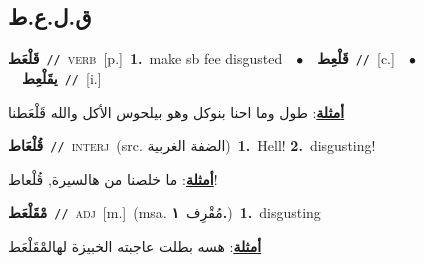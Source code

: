 \documentclass[10pt,a4paper,twoside]{article} %
\begin{document}
\begin{multicols}{2}
\vspace{-3mm}
\subsection*{\color{blue}\foreignlanguage{arabic}{ق.ل.ع.ط}\color{blue}{}} 

{\setlength\topsep{0pt}\textbf{\foreignlanguage{arabic}{قَلْعَط}}\ {\color{gray}\texttt{//}\color{black}}\ \textsc{verb}\ [p.]\ \textbf{1.}~make sb fee disgusted\ \ $\bullet$\ \ \setlength\topsep{0pt}\textbf{\foreignlanguage{arabic}{قَلْعِط}}\ {\color{gray}\texttt{//}\color{black}}\ [c.]\ \ $\bullet$\ \ \setlength\topsep{0pt}\textbf{\foreignlanguage{arabic}{يقَلْعِط}}\ {\color{gray}\texttt{//}\color{black}}\ [i.]\  \begin{flushright}\color{gray}\foreignlanguage{arabic}{\textbf{\underline{\foreignlanguage{arabic}{أمثلة}}}: طول وما احنا بنوكل وهو بيلحوس الأكل والله قَلْعَطنا}\end{flushright}\color{black}} \vspace{2mm}

{\setlength\topsep{0pt}\textbf{\foreignlanguage{arabic}{قُلْعَاط}}\ {\color{gray}\texttt{//}\color{black}}\ \textsc{interj}\ (src. \color{gray}\foreignlanguage{arabic}{الضفة الغربية}\color{black})\ \textbf{1.}~Hell!  \textbf{2.}~disgusting!\  \begin{flushright}\color{gray}\foreignlanguage{arabic}{\textbf{\underline{\foreignlanguage{arabic}{أمثلة}}}: ما خلصنا من هالسيرة, قُلْعاط!}\end{flushright}\color{black}} \vspace{2mm}

{\setlength\topsep{0pt}\textbf{\foreignlanguage{arabic}{مْقَلْعَط}}\ {\color{gray}\texttt{//}\color{black}}\ \textsc{adj}\ [m.]\ \color{gray}(msa. \foreignlanguage{arabic}{مُقْرِف}~\foreignlanguage{arabic}{\textbf{١.}})\color{black}\ \textbf{1.}~disgusting\  \begin{flushright}\color{gray}\foreignlanguage{arabic}{\textbf{\underline{\foreignlanguage{arabic}{أمثلة}}}: هسه بطلت عاجبته الخبيزة لهالمْقَلْعَط}\end{flushright}\color{black}} \vspace{2mm}


\end{multicols}
\end{document}
